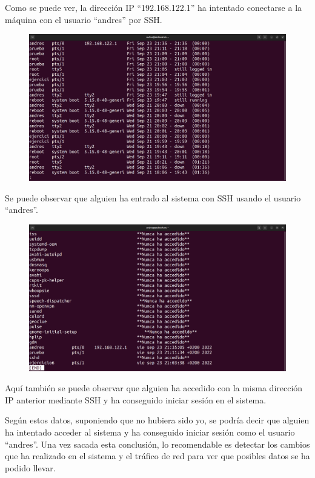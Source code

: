 \documentclass{article}
\begin{document}
Como se puede ver, la dirección IP ``192.168.122.1'' ha intentado conectarse a la máquina con el usuario ``andres'' por SSH. 

\begin{figure}[H]
    \includegraphics[width=\textwidth]{imagenes/lastip.png}
\end{figure}

Se puede observar que alguien ha entrado al sistema con SSH usando el usuario ``andres''.

\begin{figure}[H]
    \includegraphics[width=\textwidth]{imagenes/lastlogip.png}
\end{figure}

Aquí también se puede observar que alguien ha accedido con la misma dirección IP anterior mediante SSH y ha conseguido iniciar sesión en el sistema.

Según estos datos, suponiendo que no hubiera sido yo, se podría decir que alguien ha intentado acceder al sistema y ha conseguido iniciar sesión como el usuario ``andres''. Una vez sacada esta conclusión, lo recomendable es detectar los cambios que ha realizado en el sistema y el tráfico de red para ver que posibles datos se ha podido llevar.
\end{document}
